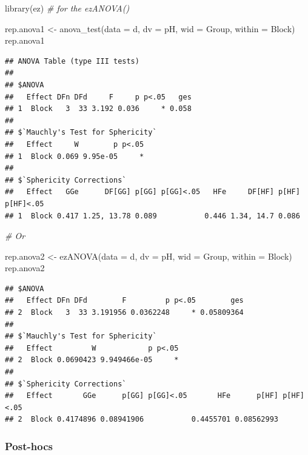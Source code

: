 \documentclass[
]{book}
\newenvironment{Shaded}{\begin{snugshade}}{\end{snugshade}}
\newcommand{\AttributeTok}[1]{\textcolor[rgb]{0.77,0.63,0.00}{#1}}
\newcommand{\CommentTok}[1]{\textcolor[rgb]{0.56,0.35,0.01}{\textit{#1}}}
\newcommand{\FunctionTok}[1]{\textcolor[rgb]{0.00,0.00,0.00}{#1}}
\newcommand{\NormalTok}[1]{#1}
\newcommand{\OtherTok}[1]{\textcolor[rgb]{0.56,0.35,0.01}{#1}}
\begin{document}
\begin{Shaded}
\begin{Highlighting}[]
\FunctionTok{library}\NormalTok{(ez)  }\CommentTok{\# for the ezANOVA()}

\NormalTok{rep.anova1 }\OtherTok{\textless{}{-}} \FunctionTok{anova\_test}\NormalTok{(}\AttributeTok{data =}\NormalTok{ d, }\AttributeTok{dv =}\NormalTok{ pH, }\AttributeTok{wid =}\NormalTok{ Group, }\AttributeTok{within =}\NormalTok{ Block)}
\NormalTok{rep.anova1}
\end{Highlighting}
\end{Shaded}

\begin{verbatim}
## ANOVA Table (type III tests)
## 
## $ANOVA
##   Effect DFn DFd     F     p p<.05   ges
## 1  Block   3  33 3.192 0.036     * 0.058
## 
## $`Mauchly's Test for Sphericity`
##   Effect     W        p p<.05
## 1  Block 0.069 9.95e-05     *
## 
## $`Sphericity Corrections`
##   Effect   GGe      DF[GG] p[GG] p[GG]<.05   HFe     DF[HF] p[HF] p[HF]<.05
## 1  Block 0.417 1.25, 13.78 0.089           0.446 1.34, 14.7 0.086
\end{verbatim}

\begin{Shaded}
\begin{Highlighting}[]
\CommentTok{\# Or}

\NormalTok{rep.anova2 }\OtherTok{\textless{}{-}} \FunctionTok{ezANOVA}\NormalTok{(}\AttributeTok{data =}\NormalTok{ d, }\AttributeTok{dv =}\NormalTok{ pH, }\AttributeTok{wid =}\NormalTok{ Group, }\AttributeTok{within =}\NormalTok{ Block)}
\NormalTok{rep.anova2}
\end{Highlighting}
\end{Shaded}

\begin{verbatim}
## $ANOVA
##   Effect DFn DFd        F         p p<.05        ges
## 2  Block   3  33 3.191956 0.0362248     * 0.05809364
## 
## $`Mauchly's Test for Sphericity`
##   Effect         W            p p<.05
## 2  Block 0.0690423 9.949466e-05     *
## 
## $`Sphericity Corrections`
##   Effect       GGe      p[GG] p[GG]<.05       HFe      p[HF] p[HF]<.05
## 2  Block 0.4174896 0.08941906           0.4455701 0.08562993
\end{verbatim}

\hypertarget{post-hocs}{%
\subsubsection{Post-hocs}\label{post-hocs}}
\end{document}
